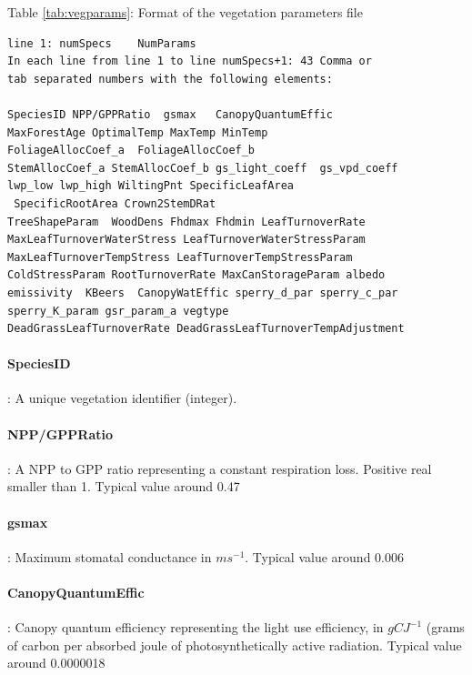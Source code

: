 \begin{center}
Table \ref{tab:vegparams}: Format of the vegetation parameters file
\begin{Frame}\label{tab:vegparams}
\begin{verbatim}
line 1: numSpecs	NumParams												
In each line from line 1 to line numSpecs+1: 43 Comma or
tab separated numbers with the following elements:

SpeciesID NPP/GPPRatio	gsmax	CanopyQuantumEffic
MaxForestAge OptimalTemp MaxTemp MinTemp 
FoliageAllocCoef_a	FoliageAllocCoef_b 
StemAllocCoef_a	StemAllocCoef_b	gs_light_coeff	gs_vpd_coeff
lwp_low lwp_high WiltingPnt	SpecificLeafArea
 SpecificRootArea Crown2StemDRat 
TreeShapeParam	WoodDens Fhdmax	Fhdmin LeafTurnoverRate
MaxLeafTurnoverWaterStress LeafTurnoverWaterStressParam
MaxLeafTurnoverTempStress LeafTurnoverTempStressParam
ColdStressParam	RootTurnoverRate MaxCanStorageParam albedo
emissivity	KBeers	CanopyWatEffic sperry_d_par sperry_c_par 
sperry_K_param gsr_param_a vegtype 
DeadGrassLeafTurnoverRate DeadGrassLeafTurnoverTempAdjustment 

\end{verbatim}
\end{Frame}
\end{center} 

\hangindent=0.7cm
\paragraph{SpeciesID}: A unique vegetation identifier (integer).

\hangindent=0.7cm
\paragraph{NPP/GPPRatio}: A NPP to GPP ratio representing a constant respiration loss. Positive real smaller than 1. Typical value around 0.47

\hangindent=0.7cm
\paragraph{gsmax}: Maximum stomatal conductance in $ms^{-1}$. Typical value around 0.006

\hangindent=0.7cm
\paragraph{CanopyQuantumEffic}: Canopy quantum efficiency representing the light use efficiency, in $gCJ^{-1}$ (grams of carbon per absorbed joule of photosynthetically active radiation. Typical value around 0.0000018


